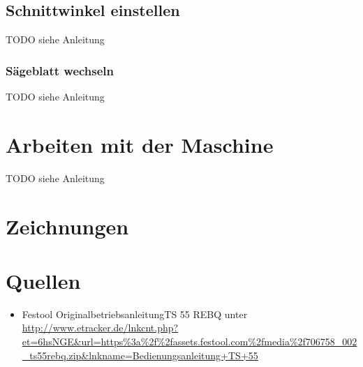 \documentclass{\basedir/fablab-document}
\begin{document}
\subsection{Schnittwinkel einstellen}
TODO siehe Anleitung

\subsubsection{Sägeblatt wechseln}
TODO siehe Anleitung

\section{Arbeiten mit der Maschine}
TODO siehe Anleitung

\section{Zeichnungen}
\begin{figure}[h]
	\centering
	\caption{}
	\label{fig:gehaeuse_oben}
\end{figure}

\begin{figure}[h]
	\centering
	\caption{}
	\label{fig:gehaeuse_oben}
\end{figure}

\begin{figure}[h]
	\centering
	\caption{}
	\label{fig:gehaeuse_oben}
\end{figure}

\begin{figure}[h]
	\centering
	\caption{}
	\label{fig:gehaeuse_oben}
\end{figure}


\newpage
\section{Quellen}
\begin{itemize}
\item Festool \glqq Originalbetriebsanleitung\grqq TS 55 REBQ unter 
\url{http://www.etracker.de/lnkcnt.php?et=6hsNGE&url=https\%3a\%2f\%2fassets.festool.com\%2fmedia\%2f706758_002_ts55rebq.zip&lnkname=Bedienungsanleitung+TS+55}
\end{itemize}
\end{document}
